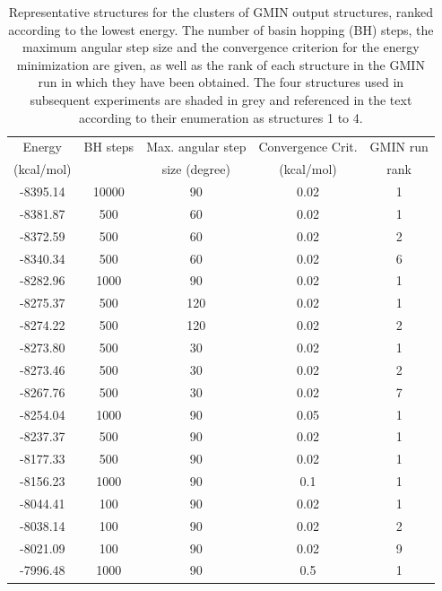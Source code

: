\documentclass[english, a4paper, 12pt, titlepage, draft]{article}
\begin{document}
\begin{table}
\centering
\begin{tabular}{c c c c c}
    \hline \hline
    Energy     & BH steps & Max. angular step & Convergence Crit. & GMIN run \\ 
    (kcal/mol) &          & size (degree)     & (kcal/mol)        & rank     \\
    \hline
    \rowcolor{lightgray}
    -8395.14   & 10000    &  90               & 0.02              & 1        \\ 
    \rowcolor{lightgray}
    -8381.87   &   500    &  60               & 0.02              & 1        \\
    -8372.59   &   500    &  60               & 0.02              & 2        \\
    \rowcolor{lightgray}
    -8340.34   &   500    &  60               & 0.02              & 6        \\
    -8282.96   &  1000    &  90               & 0.02              & 1        \\
    \rowcolor{lightgray}
    -8275.37   &   500    & 120               & 0.02              & 1        \\
    -8274.22   &   500    & 120               & 0.02              & 2        \\
    -8273.80   &   500    &  30               & 0.02              & 1        \\
    -8273.46   &   500    &  30               & 0.02              & 2        \\
    -8267.76   &   500    &  30               & 0.02              & 7        \\
    -8254.04   &  1000    &  90               & 0.05              & 1        \\
    -8237.37   &   500    &  90               & 0.02              & 1        \\
    -8177.33   &   500    &  90               & 0.02              & 1        \\
    -8156.23   &  1000    &  90               & 0.1               & 1        \\
    -8044.41   &   100    &  90               & 0.02              & 1        \\
    -8038.14   &   100    &  90               & 0.02              & 2        \\
    -8021.09   &   100    &  90               & 0.02              & 9        \\
    -7996.48   &  1000    &  90               & 0.5               & 1        \\
    \hline \hline
\end{tabular}
\caption{Representative structures for the clusters of GMIN output structures, ranked according to the lowest energy.
The number of basin hopping (BH) steps, the maximum angular step size and the convergence criterion for the energy minimization are given, as well as the rank of each structure in the GMIN run in which they have been obtained.
    The four structures used in subsequent experiments are shaded in grey and referenced in the text according to their enumeration as structures 1 to 4.}
\label{tab:GMIN_structures}
\end{table} 
\end{document}
